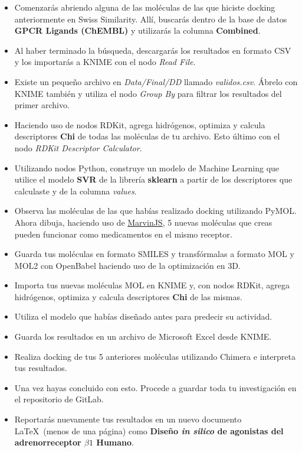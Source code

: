 \documentclass[10pt,letterpaper]{article}
\begin{document}
\begin{itemize}
\item Comenzar\'as abriendo alguna de las mol\'eculas de las que hiciste docking anteriormente en Swiss Similarity. All\'i, buscar\'as dentro de la base de datos \textbf{GPCR Ligands (ChEMBL)} y utilizar\'as la columna \textbf{Combined}.
\item Al haber terminado la b\'usqueda, descargar\'as los resultados en formato CSV y los importar\'as a KNIME con el nodo \textit{Read File}.
\item Existe un peque\~no archivo en \textit{Data/Final/DD} llamado \textit{validos.csv}. \'Abrelo con KNIME tambi\'en y utiliza el nodo \textit{Group By} para filtrar los resultados del primer archivo.
\item Haciendo uso de nodos RDKit, agrega hidr\'ogenos, optimiza y calcula descriptores \textbf{Chi} de todas las mol\'eculas de tu archivo. Esto \'ultimo con el nodo \textit{RDKit Descriptor Calculator}.
\item Utilizando nodos Python, construye un modelo de Machine Learning que utilice el modelo \textbf{SVR} de la librer\'ia \textbf{sklearn} a partir de los descriptores que calculaste y de la columna \textit{values}.
\item Observa las mol\'eculas de las que hab\'ias realizado docking utilizando PyMOL. Ahora dibuja, haciendo uso de \href{https://marvinjs-demo.chemaxon.com/latest/demo.html}{MarvinJS}, 5 nuevas mol\'eculas que creas pueden funcionar como medicamentos en el mismo receptor.
\item Guarda tus mol\'eculas en formato SMILES y transf\'ormalas a formato MOL y MOL2 con OpenBabel haciendo uso de la optimizaci\'on en 3D.
\item Importa tus nuevas mol\'eculas MOL en KNIME y, con nodos RDKit, agrega hidr\'ogenos, optimiza y calcula descriptores \textbf{Chi} de las mismas.
\item Utiliza el modelo que hab\'ias dise\~nado antes para predecir su actividad.
\item Guarda los resultados en un archivo de Microsoft Excel desde KNIME.
\item Realiza docking de tus 5 anteriores mol\'eculas utilizando Chimera e interpreta tus resultados.
\item Una vez hayas concluido con esto. Procede a guardar toda tu investigaci\'on en el repositorio de GitLab.
\item Reportar\'as nuevamente tus resultados en un nuevo documento \LaTeX\ (menos de una p\'agina) como \textbf{Dise\~no \emph{in silico} de agonistas del adrenorreceptor $\beta 1$ Humano}.
\end{itemize}
\end{document}
